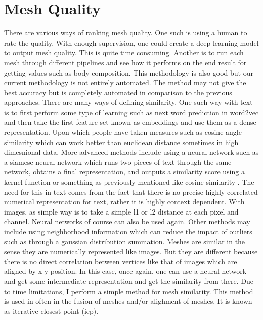 \section{Mesh Quality}
There are various ways of ranking mesh quality. One such is using a human to rate the quality. With enough supervision, one could create a deep learning model to output mesh quality. This is quite time consuming. Another is to run each mesh through different pipelines and see how it performs on the end result for getting values such as body composition. This methodology is also good but our current methodology is not entirely automated. The method may not give the best accuracy but is completely automated in comparison to the previous approaches. There are many ways of defining similarity. One such way with text is to first perform some type of learning such as next word prediction in word2vec and then take the first feature set known as embeddings and use them as a dense representation. Upon which people have taken measures such as cosine angle similarity which can work better than euclidean distance sometimes in high dimesnional data. More advanced methods include using a neural network such as a siamese neural network which runs two pieces of text through the same network, obtains a final representation, and outputs a similarity score using a kernel function or something as previously mentioned like cosine similarity \cite{bertinetto2016fully}. The need for this in text comes from the fact that there is no precise highly correlated numerical representation for text, rather it is highly context dependent. With images, as simple way is to take a simple l1 or l2 distance at each pixel and channel. Neural networks of course can also be used again. Other methods may include using neighborhood information which can reduce the impact of outliers such as through a gaussian distribution summation. Meshes are similar in the sense they are numerically represented like images. But they are different because there is no direct correlation between vertices like that of images which are aligned by x-y position. In this case, once again, one can use a neural network and get some intermediate representation and get the similarity from there. Due to time limitations, I perform a simple method for mesh similarity. This method is used in often in the fusion of meshes and/or alighment of meshes. It is known as iterative closest point (icp).

